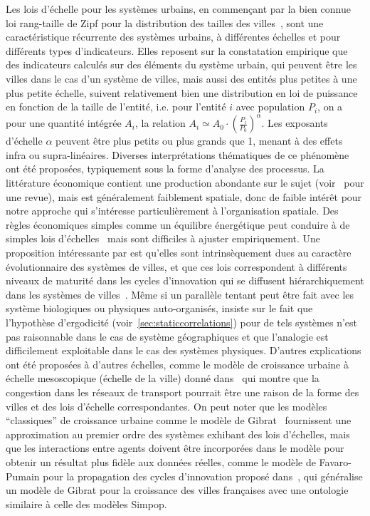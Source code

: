 {Les lois d'échelle pour les systèmes urbains, en commençant par la bien connue loi rang-taille de Zipf pour la distribution des tailles des villes~\cite{gabaix1999zipf}, sont une caractéristique récurrente des systèmes urbains, à différentes échelles et pour différents types d'indicateurs. Elles reposent sur la constatation empirique que des indicateurs calculés sur des éléments du système urbain, qui peuvent être les villes dans le cas d'un système de villes, mais aussi des entités plus petites à une plus petite échelle, suivent relativement bien une distribution en loi de puissance en fonction de la taille de l'entité, i.e. pour l'entité $i$ avec population $P_i$, on a pour une quantité intégrée $A_i$, la relation $A_i \simeq A_0\cdot \left(\frac{P_i}{P_0}\right)^{\alpha}$. Les exposants d'échelle $\alpha$ peuvent être plus petits ou plus grands que 1, menant à des effets infra ou supra-linéaires. Diverses interprétations thématiques de ce phénomène ont été proposées, typiquement sous la forme d'analyse des processus. La littérature économique contient une production abondante sur le sujet (voir~\cite{Gabaix20042341} pour une revue), mais est généralement faiblement spatiale, donc de faible intérêt pour notre approche qui s'intéresse particulièrement à l'organisation spatiale. Des règles économiques simples comme un équilibre énergétique peut conduire à de simples lois d'échelles~\cite{bettencourt2008large} mais sont difficiles à ajuster empiriquement. Une proposition intéressante par  est qu'elles sont intrinsèquement dues au caractère évolutionnaire des systèmes de villes, et que ces lois correspondent à différents niveaux de maturité dans les cycles d'innovation qui se diffusent hiérarchiquement dans les systèmes de villes~\cite{pumain2006evolutionary}. Même si un parallèle tentant peut être fait avec les système biologiques ou physiques auto-organisés, \cite{pumain2012urban} insiste sur le fait que l'hypothèse d'ergodicité (voir~\ref{sec:staticcorrelations}) pour de tels systèmes n'est pas raisonnable dans le cas de système géographiques et que l'analogie est difficilement exploitable dans le cas des systèmes physiques. D'autres explications ont été proposées à d'autres échelles, comme le modèle de croissance urbaine à échelle mesoscopique (échelle de la ville) donné dans~\cite{louf2014congestion} qui montre que la congestion dans les réseaux de transport pourrait être une raison de la forme des villes et des lois d'échelle correspondantes. On peut noter que les modèles ``classiques'' de croissance urbaine comme le modèle de Gibrat~\cite{favaro2011gibrat} fournissent une approximation au premier ordre des systèmes %
 exhibant des lois d'échelles, mais que les interactions entre agents doivent être incorporées dans le modèle pour obtenir un résultat plus fidèle aux données réelles, comme le modèle de Favaro-Pumain pour la propagation des cycles d'innovation proposé dans~\cite{favaro2011gibrat}, qui généralise un modèle de Gibrat pour la croissance des villes françaises avec une ontologie similaire à celle des modèles Simpop.
}

